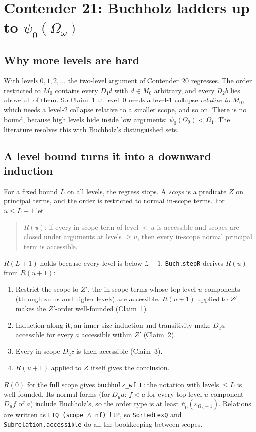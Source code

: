 \documentclass[11pt]{article}
\theoremstyle{definition}
\theoremstyle{remark}
\newcommand{\lean}[1]{\texttt{#1}}
\begin{document}
\section{Contender 21: Buchholz ladders up to \texorpdfstring{$\psi_0(\Omega_\omega)$}{psi0(Omega omega)}}

\subsection{Why more levels are hard}
With levels $0,1,2,\dots$ the two-level argument of Contender~20 regresses.
The order restricted to $M_0$ contains every $D_1d$ with $d\in M_0$ arbitrary,
and every $D_2b$ lies above all of them. So Claim~1 at level~0 needs a level-1
collapse \emph{relative to} $M_0$, which needs a level-2 collapse relative to a
smaller scope, and so on. There is no bound, because high levels hide inside
low arguments: $\psi_0(\Omega_9)<\Omega_1$. The literature resolves this with
Buchholz's distinguished sets.

\subsection{A level bound turns it into a downward induction}
For a fixed bound $L$ on all levels, the regress stops. A \emph{scope} is a
predicate $Z$ on principal terms, and the order is restricted to normal
in-scope terms. For $u\le L+1$ let
\begin{quote}
$R(u)$: if every in-scope term of level ${<}\,u$ is accessible and scopes are
closed under arguments at levels $\ge u$, then every in-scope normal principal
term is accessible.
\end{quote}
$R(L+1)$ holds because every level is below $L+1$. \lean{Buch.stepR} derives
$R(u)$ from $R(u+1)$:
\begin{enumerate}
\item Restrict the scope to $Z'$, the in-scope terms whose top-level
  $u$-components (through sums and higher levels) are accessible. $R(u+1)$
  applied to $Z'$ makes the $Z'$-order well-founded (Claim~1).
\item Induction along it, an inner size induction and transitivity make
  $D_ua$ accessible for every $a$ accessible within $Z'$ (Claim~2).
\item Every in-scope $D_uc$ is then accessible (Claim~3).
\item $R(u+1)$ applied to $Z$ itself gives the conclusion.
\end{enumerate}
$R(0)$ for the full scope gives \lean{buchholz\_wf L}: the notation with levels
$\le L$ is well-founded. Its normal forms (for $D_ua$: $f<a$ for every top-level
$u$-component $D_uf$ of $a$) include Buchholz's, so the order type is at least
$\psi_0(\varepsilon_{\Omega_L+1})$. Relations are written as \lean{LTQ (scope
$\wedge$ nf) ltP}, so \lean{SortedLexQ} and \lean{Subrelation.accessible} do
all the bookkeeping between scopes.
\end{document}
